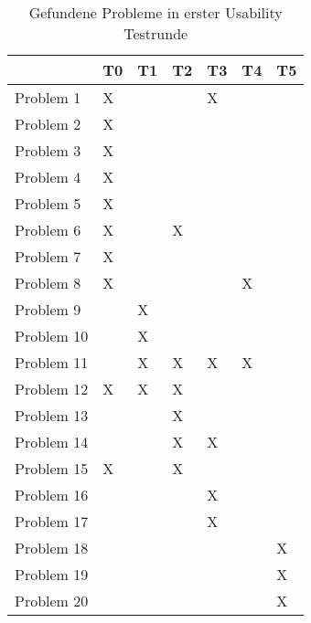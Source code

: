 \begin{table}[H]
    \caption{Gefundene Probleme in erster Usability Testrunde}\label{tbl:1stUsabilityTestsProblems}
    \begin{tabular}{l|l|l|l|l|l|l}
                & T0    & T1    & T2    & T3    & T4    & T5    \\ \hline
    Problem 1   & X     &       &       & X     &       &       \\
    Problem 2   & X     &       &       &       &       &       \\
    Problem 3   & X     &       &       &       &       &       \\
    Problem 4   & X     &       &       &       &       &       \\
    Problem 5   & X     &       &       &       &       &       \\
    Problem 6   & X     &       & X     &       &       &       \\
    Problem 7   & X     &       &       &       &       &       \\
    Problem 8   & X     &       &       &       & X     &       \\
    Problem 9   &       & X     &       &       &       &       \\
    Problem 10  &       & X     &       &       &       &       \\
    Problem 11  &       & X     & X     & X     & X     &       \\
    Problem 12  & X     & X     & X     &       &       &       \\
    Problem 13  &       &       & X     &       &       &       \\
    Problem 14  &       &       & X     & X     &       &       \\
    Problem 15  & X     &       & X     &       &       &       \\
    Problem 16  &       &       &       & X     &       &       \\
    Problem 17  &       &       &       & X     &       &       \\
    Problem 18  &       &       &       &       &       & X     \\
    Problem 19  &       &       &       &       &       & X     \\
    Problem 20  &       &       &       &       &       & X     \\
    \end{tabular}    
\end{table}

